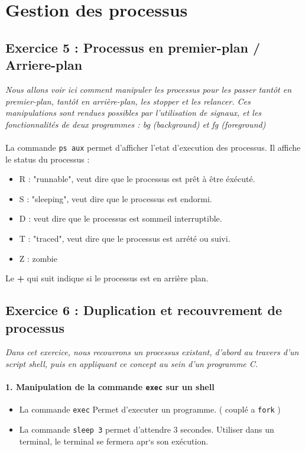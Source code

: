\section{Gestion des processus}

\subsection{Exercice 5 : Processus en premier-plan / Arriere-plan}
\textit{Nous allons voir ici comment manipuler les processus pour les passer tantôt en premier-plan, tantôt en arrière-plan, les stopper et les relancer. Ces manipulations sont rendues possibles par l’utilisation de signaux, et les fonctionnalités de deux programmes : bg (background) et fg (foreground)}
\\\\
La commande \texttt{ps aux} permet d'afficher l'etat d'execution des processus.
Il affiche le status du processus :
\begin{itemize}
\item R : "runnable", veut dire que le processus est prêt à être éxécuté.
\item S : "sleeping", veut dire que le processus est endormi.
\item D : veut dire que le processus est sommeil interruptible.
\item T : "traced", veut dire que le processus est arrété ou suivi.
\item Z : zombie
\end{itemize}
Le \textbf{+} qui suit indique si le processus est en arrière plan.

\subsection{Exercice 6 : Duplication et recouvrement de processus}
\textit{Dans cet exercice, nous recouvrons un processus existant, d’abord au travers d’un script shell, puis en appliquant ce concept au sein d’un programme C.}
\paragraph{1. Manipulation de la commande \texttt{exec} sur un shell}
\begin{itemize}
  \item La commande \texttt{exec} Permet d'executer un programme. ( couplé a \texttt{fork} )
  \item La commande \texttt{sleep 3} permet d'attendre 3 secondes.
  Utiliser dans un terminal, le terminal se fermera apr`s son exécution.
\end{itemize}

